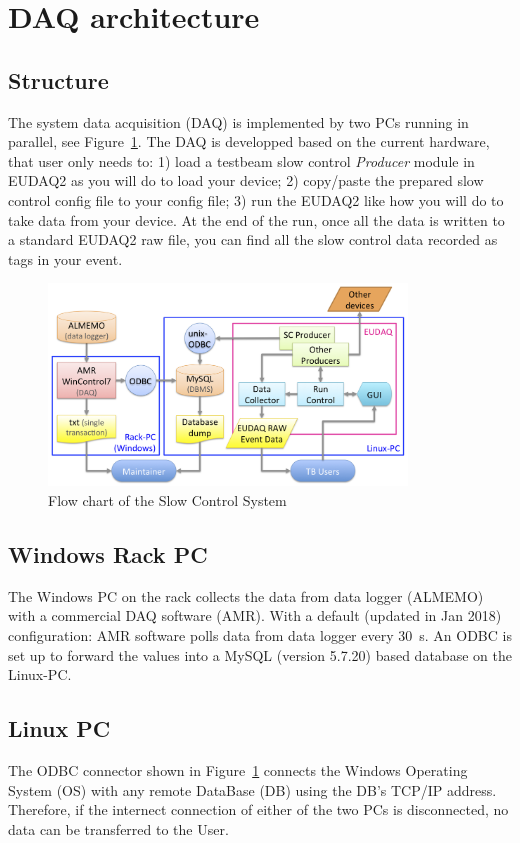\documentclass[a4paper,12pt]{scrartcl}
\begin{document}
\section{DAQ architecture}
\subsection{Structure}
The system data acquisition (DAQ) is implemented by two PCs running in parallel, see Figure~\ref{fig:DAQflow}.
The DAQ is developped based on the current hardware, that user only needs to: 1) load a testbeam slow control \textit{Producer} module in EUDAQ2 as you will do to load your device; 2) copy/paste the prepared slow control config file to your config file; 3) run the EUDAQ2 like how you will do to take data from your device. At the end of the run, once all the data is written to a standard EUDAQ2 raw file, you can find all the slow control data recorded as tags in your event.

\begin{figure}[!ht] \centering
\includegraphics[width=0.85\textwidth]{figs/FlowChartSCS.png}
\caption{Flow chart of the Slow Control System}
\label{fig:DAQflow}
\end{figure}

\subsection{Windows Rack PC}
The Windows PC on the rack collects the data from data logger (ALMEMO) with a commercial DAQ software (AMR).
With a default (updated in Jan 2018) configuration: AMR software polls data from data logger every \SI{30}{s}.
An ODBC is set up to forward the values into a MySQL (version 5.7.20) based database on the Linux-PC.

\subsection{Linux PC}
The ODBC connector shown in Figure~\ref{fig:DAQflow} connects the Windows Operating System (OS) with any remote DataBase (DB) using the DB's TCP/IP address. Therefore, if the internect connection of either of the two PCs is disconnected, no data can be transferred to the User.
\end{document}
